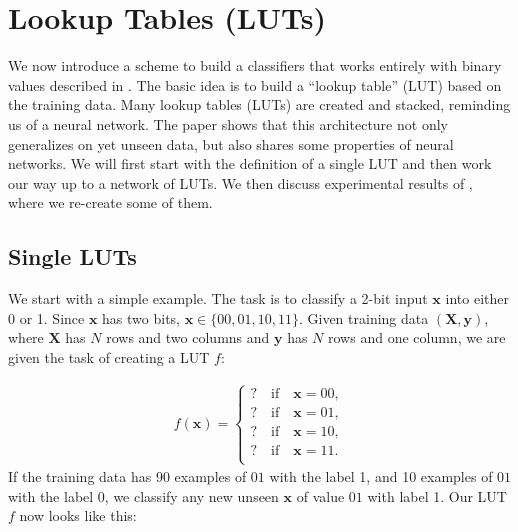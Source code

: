 \section{Lookup Tables (LUTs)} \label{sec:luts}
We now introduce a scheme to build a classifiers that works entirely with binary values described in \cite{bib:chatterjee2018learning}. The basic idea is to build a \enquote{lookup table} (LUT) based on the training data. Many lookup tables (LUTs) are created and stacked, reminding us of a neural network. The paper shows that this architecture not only generalizes on yet unseen data, but also shares some properties of neural networks. We will first start with the definition of a single LUT and then work our way up to a network of LUTs. We then discuss experimental results of \cite{bib:chatterjee2018learning}, where we re-create some of them.

\subsection{Single LUTs}
We start with a simple example. The task is to classify a 2-bit input $\bm{x}$ into either 0 or 1. Since $\bm{x}$ has two bits, $\bm{x} \in \{00, 01, 10, 11 \}$. Given training data $(\bm{X}, \bm{y})$, where $\bm{X}$ has $N$ rows and two columns and $\bm{y}$ has $N$ rows and one column, we are given the task of creating a LUT $f$:

\begin{align}
    f(\bm{x}) = \begin{cases}
        ? \quad \text{if} \quad \bm{x} = 00, \\
        ? \quad \text{if} \quad \bm{x} = 01, \\
        ? \quad \text{if} \quad \bm{x} = 10, \\
        ? \quad \text{if} \quad \bm{x} = 11. \\
    \end{cases}
\end{align} If the training data has 90 examples of $01$ with the label 1, and 10 examples of $01$ with the label 0, we classify any new unseen $\bm{x}$ of value $01$ with label 1. Our LUT $f$ now looks like this:

